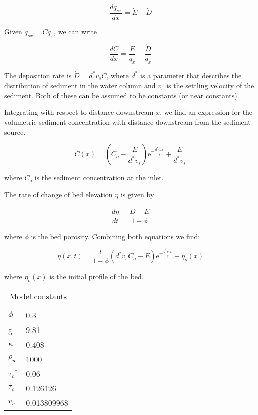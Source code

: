 \documentclass[11pt]{article}
\newcommand{\me}{\mathrm{e}}
\begin{document}
\begin{equation}
\frac{dq_{sx}}{dx} = \dot{E} - \dot{D}
\end{equation}

Given $q_{sx} = Cq_x$, we can write

\begin{equation}
\frac{dC}{dx} = \frac{\dot{E}}{q_x} - \frac{\dot{D}}{q_x}
\end{equation}

The deposition rate is $\dot{D} = d^*v_sC$, where $d^*$ is a parameter that describes the distribution of sediment in the water column and $v_s$ is the settling velocity of the sediment. Both of these can be assumed to be constants (or near constants).

Integrating with respect to distance downstream $x$, we find an expression for the volumetric sediment concentration with distance downstream from the sediment source.

\begin{equation}
C(x) = \left(C_o - \frac{\dot{E}}{d^*v_s}\right)\me^{-\frac{d^* v_s x}{q}} + \frac{\dot{E}}{d^* v_s}
\end{equation}

\noindent where $C_o$ is the sediment concentration at the inlet.

The rate of change of bed elevation $\eta$ is given by

\begin{equation}
\frac{d\eta}{dt} = \frac{\dot{D} - \dot{E}}{1 - \phi}
\end{equation}

\noindent where $\phi$ is the bed porosity. Combining both equations we find:

\begin{equation}
\eta(x,t) = \frac{t}{1-\phi} \left(d^* v_s C_o - \dot{E}\right) \me^{-\frac{d^* v_s x}{q}} + \eta_o(x)
\end{equation}

\noindent where $\eta_o(x)$ is the initial profile of the bed.


\begin{table}[]
\centering
\caption{Model constants}
\label{table:model_params}
\begin{tabular}{ll}
$\phi$ & 0.3 \\
g & 9.81 \\
$\kappa$ & 0.408 \\
$\rho_w$ & 1000 \\
${\tau_c}^*$ & 0.06 \\
${\tau_c}$ & 0.126126 \\
$v_s$ & 0.013809968
\end{tabular}
\end{table}
\end{document}
